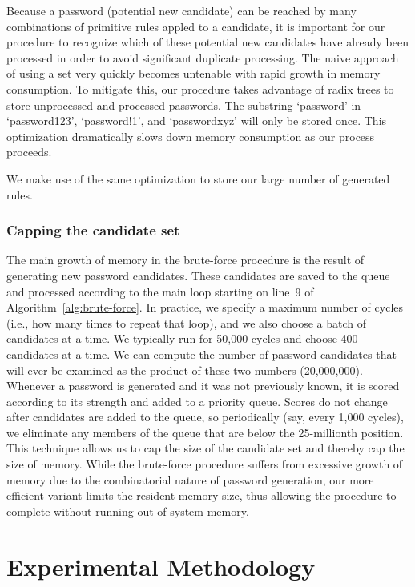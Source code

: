 \documentclass[letterpaper,twocolumn,10pt]{article}
\begin{document}
Because a password (potential new candidate) can be reached by many combinations of
primitive rules appled to a candidate, it is important for our procedure to recognize which
of these potential new candidates have already been processed in order to avoid significant
duplicate processing. The naive approach of using a set very quickly becomes untenable with
rapid growth in memory consumption. To mitigate this, our procedure takes advantage of radix trees
to store unprocessed and processed passwords. The substring `password' in 
`password123', `password!1', and `passwordxyz' will only be stored once. This optimization
dramatically slows down memory consumption as our process proceeds.

We make use of the same optimization to store our large number of generated rules.

\subsubsection{Capping the candidate set}

The main growth of memory in the brute-force procedure is the result of
generating new password candidates. These candidates are saved to the queue and
processed according to the main loop starting on line~9 of
Algorithm~\ref{alg:brute-force}. In practice, we specify a maximum number of
cycles (i.e., how many times to repeat that loop), and we also choose a batch
of candidates at a time. We typically run for 50,000 cycles and choose 400
candidates at a time. We can compute the number of password candidates that
will ever be examined as the product of these two numbers (20,000,000).
Whenever a password is generated and it was not previously known, it is scored
according to its strength and added to a priority queue. Scores do not change
after candidates are added to the queue, so periodically (say, every 1,000
cycles), we eliminate any members of the queue that are below the 25-millionth
position. This technique allows us to cap the size of the candidate set and
thereby cap the size of memory. While the brute-force procedure suffers from
excessive growth of memory due to the combinatorial nature of password
generation, our more efficient variant limits the resident memory size, thus
allowing the procedure to complete without running out of system memory.

\section{Experimental Methodology}
\end{document}
